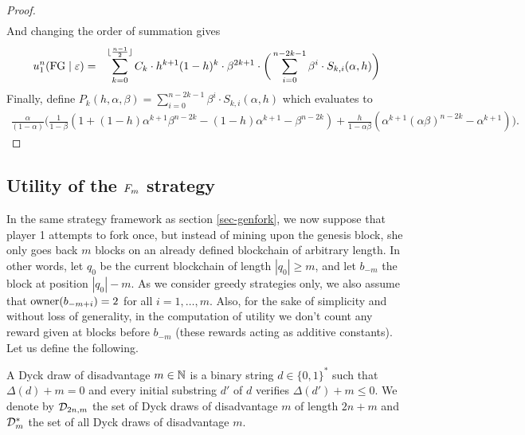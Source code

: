 \begin{proof}
\begin{eqnarray*}
\end{eqnarray*}
And changing the order of summation gives
\begin{eqnarray*}
	u_1^n(\text{\rm FG} \mid \varepsilon)	& = & \sum_{k=0}^{\lfloor\frac{n-1}{2}\rfloor}C_k \cdot h^{k+1}(1-h)^{k}\cdot \beta^{2k+1}\cdot\bigg(\sum_{i=0}^{n-2k-1}\beta^i\cdot  S_{k,i}(\alpha,h)\bigg)
\end{eqnarray*}
Finally, define $P_k(h,\alpha,\beta) = \sum_{i=0}^{n-2k-1}\beta^i\cdot  S_{k,i}(\alpha,h)$
which evaluates to
\begin{eqnarray*}
\frac{\alpha}{(1-\alpha)}\bigg(\frac{1}{1-\beta}(1+(1-h)\alpha^{k+1}\beta^{n-2k}-(1-h)\alpha^{k+1}-\beta^{n-2k})+\frac{h}{1-\alpha\beta}(\alpha^{k+1}(\alpha\beta)^{n-2k}-\alpha^{k+1})\bigg).
\end{eqnarray*}

\end{proof}



\subsection{Utility of the $F_m$ strategy}
\label{sec-mforkutility}


In the same strategy framework as section \ref{sec-genfork}, we now suppose that player 1 attempts to fork once, but instead of mining upon the genesis block, she only goes back $m$ blocks on an already defined blockchain of arbitrary length. In other words, let $q_0$ be the current blockchain of length $|q_0|\geq m$, and let $b_{-m}$ the block at position $|q_0|-m$. As we consider greedy strategies only, we also assume that $\text{\rm owner}(b_{-m+i})=2$ for all $i=1,\dots,m$. Also, for the sake of simplicity and without loss of generality, in the computation of utility we don't count any reward given at blocks before $b_{-m}$ (these rewards acting as additive constants). Let us define the following.
\begin{mydef}
	A Dyck draw of disadvantage $m\in\mathbb{N}$ is a binary string $d\in\{0,1\}^\ast$ such that $\Delta(d)+m=0$ and every initial substring $d'$ of $d$ verifies $\Delta(d')+m\leq 0$. We denote by $\mathcal{D}_{2n,m}$ the set of Dyck draws of disadvantage $m$ of length $2n+m$ and $\mathcal{D}^\ast_{m}$ the set of all Dyck draws of disadvantage $m$.
\end{mydef}

